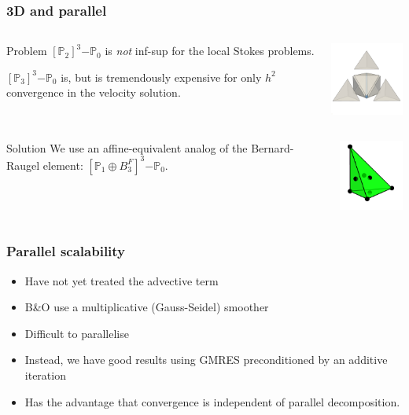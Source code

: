 \documentclass[presentation]{beamer}
\newcommand{\PtwothreePzero}{\ensuremath{[\mathbb{P}_2]^3\mathrm{-}\mathbb{P}_0}\xspace}
\newcommand{\PthreePzero}{\ensuremath{[\mathbb{P}_3]^3\mathrm{-}\mathbb{P}_0}\xspace}
\newcommand{\Pzero}{\ensuremath{\mathbb{P}_0}\xspace}
\newcommand{\PoneFB}{\ensuremath{\mathbb{P}_1 \oplus B^F_3}\xspace}
\begin{document}
\begin{frame}
  \frametitle{3D and parallel}
  \begin{columns}
    \begin{column}{0.6\textwidth}
      \begin{block}{Problem}
        $\PtwothreePzero$ is \emph{not} inf-sup for the local Stokes problems.

        $\PthreePzero$ is, but is tremendously expensive for only $h^2$
        convergence in the velocity solution.
      \end{block}
    \end{column}
    \begin{column}{0.38\textwidth}
      \includegraphics[width=3.5cm]{exploded_tet}
    \end{column}
  \end{columns}

  \begin{columns}
    \begin{column}{0.6\textwidth}
      \begin{block}{Solution}
        We use an affine-equivalent analog of the Bernard-Raugel
        element: $[\PoneFB]^{3}\mathrm{-}\Pzero$.
      \end{block}
    \end{column}
    \begin{column}{0.38\textwidth}
      \includegraphics[width=3cm]{P1FB}
    \end{column}
  \end{columns}
\end{frame}

\begin{frame}
  \frametitle{Parallel scalability}
  \begin{itemize}
  \item Have not yet treated the advective term
  \item B\&O use a multiplicative (Gauss-Seidel) smoother
  \item Difficult to parallelise
  \item Instead, we have good results using GMRES preconditioned by an
    additive iteration
  \item Has the advantage that convergence is independent of parallel
    decomposition.
  \end{itemize}
\end{frame}
\end{document}
